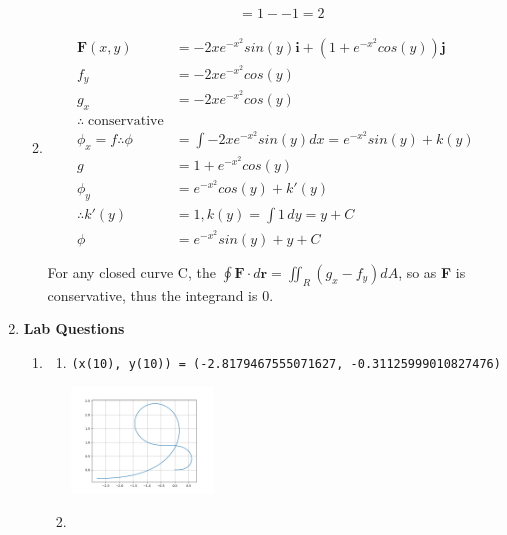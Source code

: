 \documentclass[11pt]{article}
\begin{document}
\begin{preview}
\begin{enumerate}
\begin{enumerate}
\begin{align*}
                                                               & = 1 - -1 = 2
                  \end{align*}
            \item 
            \begin{align*}
                  \textbf{F}(x,y) &= -2xe^{-x^2}sin(y)\textbf{i} + (1+e^{-x^2}cos(y))\textbf{j} \\
                  f_y &= -2xe^{-x^2}cos(y) \\
                  g_x &= -2xe^{-x^2}cos(y) \\
                  \therefore \; \mathrm{conservative} \\
                  \phi_x = f \therefore \phi &= \int -2xe^{-x^2}sin(y) dx = e^{-x^2}sin(y)+k(y)\\
                  g &= 1+e^{-x^2}cos(y) \\
                  \phi_y &=  e^{-x^2}cos(y)+k'(y) \\
                  \therefore k'(y) &= 1, k(y) = \int 1 \,dy = y + C \\
                  \phi &= e^{-x^2}sin(y) + y + C \\
 \\            \end{align*}
            For any closed curve C, the $\oint \textbf{F}{\cdot}d \textbf{r} = \iint_R (g_x - f _y) dA$, so as \textbf{F} is conservative, thus the integrand is 0. 
          \end{enumerate}
    \item \textbf{Lab Questions}
          \begin{enumerate}
            \item
                  \begin{enumerate}
                    \item \texttt{(x(10), y(10)) = (-2.8179467555071627, -0.31125999010827476)}
                          \begin{center}
                            \includegraphics[width=0.33\textwidth]{inc/q4ai.png}
                          \end{center}
                    \item

\end{enumerate}
\end{enumerate}
\end{enumerate}
\end{preview}
\end{document}
